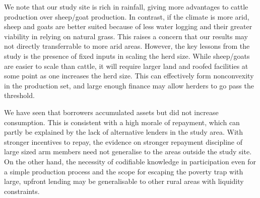 
	We note that our study site is rich in rainfall, giving more advantages to cattle production over sheep/goat production. In contrast, if the climate is more arid, sheep and goats are better suited because of less water logging and their greater viability in relying on natural grass. This raises a concern that our results may not directly transferrable to more arid areas. However,  the key lessons from the study is the presence of fixed inputs in scaling the herd size. While sheep/goats are easier to scale than cattle, it will require larger land and roofed facilities at some point as one increases the herd size. This can effectively form nonconvexity in the production set, and large enough finance may allow herders to go pass the threshold. 

	We have seen that borrowers accumulated assets but did not increase consumption. This is consistent with a high morale of repayment, which can partly be explained by the lack of alternative lenders in the study area. With stronger incentives to repay, the evidence on stronger repayment discipline of large sized arm members need not generalise to the areas outside the study site. On the other hand, the necessity of codifiable knowledge in participation even for a simple production process and the scope for escaping the poverty trap with large, upfront lending may be generalisable to other rural areas with liquidity constraints.

{\footnotesize
\setlength{\baselineskip}{8pt}

}

\appendix
\setcounter{section}{0}
\setcounter{figure}{0}
\setcounter{table}{0}
\renewcommand{\thefigure}{\Alph{section}\arabic{figure}}
\renewcommand{\thetable}{\Alph{section}\arabic{table}}
\renewcommand{\thesection}{\Alph{section}}




